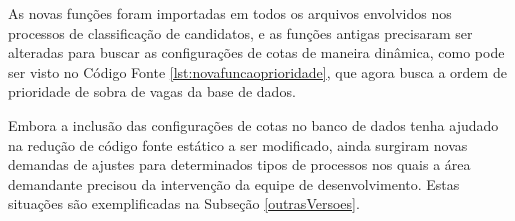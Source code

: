 As novas funções foram importadas em todos os arquivos envolvidos nos processos de classificação de candidatos, e as funções antigas precisaram ser alteradas para buscar as configurações de cotas de maneira dinâmica, como pode ser visto no Código Fonte \ref{lst:novafuncaoprioridade}, que agora busca a ordem de prioridade de sobra de vagas da base de dados. 





Embora a inclusão das configurações de cotas no banco de dados tenha ajudado na redução de código fonte estático a ser modificado, ainda surgiram novas demandas de ajustes para determinados tipos de processos nos quais a área demandante precisou da intervenção da equipe de desenvolvimento. Estas situações são
exemplificadas na Subseção \ref{outrasVersoes}.